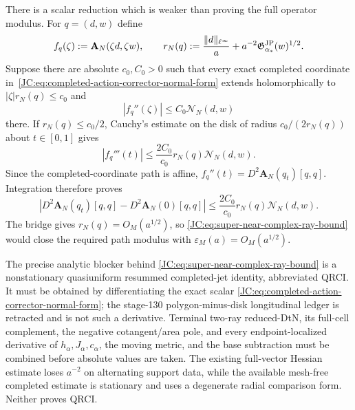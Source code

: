 \begin{contract}
There is a scalar reduction which is weaker than proving the full operator
modulus.  For $q=(d,w)$ define
\[
 f_q(\zeta):=\mathbf A_N(\zeta d,\zeta w),\qquad
 r_N(q):=\frac{\|d\|_{\ell^\infty}}a
 +a^{-2}\mathfrak G^{\rm JP}_{\alpha_*}(w)^{1/2}.
\]
Suppose there are absolute $c_0,C_0>0$ such that every exact completed
coordinate in~\eqref{JC:eq:completed-action-corrector-normal-form} extends
holomorphically to $|\zeta|r_N(q)\le c_0$ and
\begin{equation}\label{JC:eq:super-near-complex-ray-bound}
 \boxed{|f_q''(\zeta)|\le C_0\mathcal N_N(d,w)}
\end{equation}
there.  If $r_N(q)\le c_0/2$, Cauchy's estimate on the disk of radius
$c_0/(2r_N(q))$ about $t\in[0,1]$ gives
\[
 |f_q'''(t)|\le\frac{2C_0}{c_0}r_N(q)\mathcal N_N(d,w).
\]
Since the completed-coordinate path is affine,
$f_q''(t)=D^2\mathbf A_N(q_t)[q,q]$.  Integration therefore proves
\begin{equation}\label{JC:eq:super-near-Cauchy-output}
 \boxed{
 |D^2\mathbf A_N(q_t)[q,q]-D^2\mathbf A_N(0)[q,q]|
 \le\frac{2C_0}{c_0}r_N(q)\mathcal N_N(d,w).}
\end{equation}
The bridge gives $r_N(q)=O_M(a^{1/2})$, so
\eqref{JC:eq:super-near-complex-ray-bound} would close the required path
modulus with $\varepsilon_M(a)=O_M(a^{1/2})$.

The precise analytic blocker behind
\eqref{JC:eq:super-near-complex-ray-bound} is a nonstationary quasiuniform
resummed completed-jet identity, abbreviated QRCI.  It must be obtained by
differentiating the exact scalar
\eqref{JC:eq:completed-action-corrector-normal-form}; the stage-130
polygon-minus-disk longitudinal ledger is retracted and is not such a
derivative.  Terminal two-ray reduced-DtN, its full-cell complement, the
negative cotangent/area pole, and every endpoint-localized derivative of
$h_\alpha,J_\alpha,c_\alpha$, the moving metric, and the base subtraction
must be combined before absolute values are taken.  The existing
full-vector Hessian estimate loses $a^{-2}$ on alternating support data,
while the available mesh-free completed estimate is stationary and uses a
degenerate radial comparison form.  Neither proves QRCI.


\end{contract}
